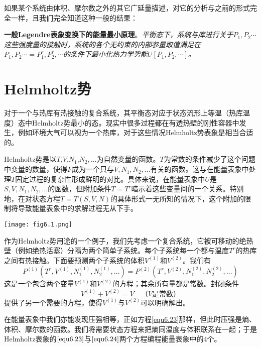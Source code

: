 如果某个系统由体积、摩尔数之外的其它广延量描述，对它的分析与之前的形式完全一样，且我们完全知道这种一般的结果：

{\bf 一般Legendre表象变换下的能量最小原理}。{\it 平衡态下，系统与库进行关于$P_1, P_2\cdots$这些强度量的接触时，系统的各个无约束的内部参量取值满足在$P_1, P_2\cdots=P_1^r, P_2^r, \cdots$的条件下最小化热力学势能$U[P_1, P_2, \cdots]$。}


\section{Helmholtz势}
\label{sec6.2}
对于一个与热库有热接触的复合系统，其平衡态对应于状态流形上等温（热库温度）态中Helmholtz势最小的态。现实中很多过程都在有透热壁的刚性容器中发生，例如环境大气可以视为一个热库，对于这些情况Helmholtz势表象是相当合适的。

Helmholtz势是以$T$,$V$,$N_1$,$N_2, \dots$为自然变量的函数。$T$为常数的条件减少了这个问题中变量的数量，使得$F$成为一个只与$V, N_1, N_2, \dots$有关的函数。这与在能量表象中处理$T$固定过程的复杂性形成鲜明的对比。具体来说，在能量表象中$U$是$S, V, N_1, N_2, \dots$的函数，但附加条件$T = T^r$暗示着这些变量间的一个关系。特别地，在对状态方程$T=T(S, V, N)$的具体形式一无所知的情况下，这个附加的限制将导致能量表象中的求解过程无从下手。

{
    \centering
    \texttt{[image: fig6.1.png]}
}

作为Helmholtz势用途的一个例子，我们先考虑一个复合系统，它被可移动的绝热壁（例如绝热活塞）分隔为两个简单子系统。每个子系统每一个都与温度$T^r$的热库之间有热接触。下面要预测两个子系统的体积$V^{(1)}$和$V^{(2)}$。我们有
\begin{equation}
\label{equ6.23}
	P^{(1)} \left(T^r, V^{(1)}, N_1^{(1)}, N_2^{(1)}, \dots \right) = P^{(2)} \left(T^r, V^{(2)}, N_1^{(2)}, N_2^{(2)}, \dots \right)
\end{equation}
这是一个包含两个变量$V^{(1)}$和$V^{(2)}$的方程；其余所有量都是常数。封闭条件
\begin{equation}
\label{equ6.24}
	V^{(1)} + V^{(2)} = V \quad \text{（$V$是常数）}
\end{equation}
提供了另一个需要的方程，使得$V^{(1)}$与$V^{(2)}$可以明确解出。

在能量表象中我们亦能发现压强相等，正如方程\eqref{equ6.23}那样，但此时压强是熵、体积、摩尔数的函数。我们将需要状态方程来把熵同温度与体积联系在一起；于是Helmholtz表象的$\eqref{equ6.23}$与$\eqref{equ6.24}$两个方程编程能量表象中的4个。

